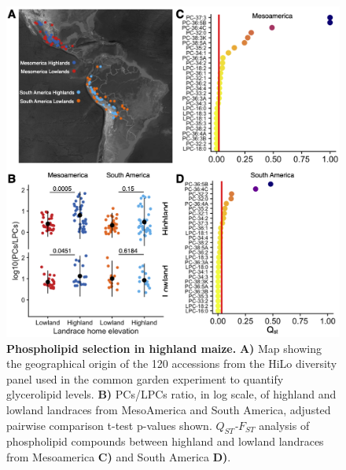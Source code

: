 \documentclass[9pt,twocolumn,twoside,lineno]{BioRxiv}
\begin{document}
\begin{figure}[!ht]
\begin{center}
\includegraphics[width=0.4\paperwidth]{Figures/Fig_1.png}
\caption{\textbf{Phospholipid selection in highland maize.} 
\textbf{A)} Map showing the geographical origin of the 120 accessions from the HiLo diversity panel used in the common garden experiment to quantify glycerolipid levels.
\textbf{B)} PCs/LPCs ratio, in log scale, of highland and lowland landraces from MesoAmerica and South America, adjusted pairwise comparison t-test p-values shown.
\textit{$Q_{ST}$-$F_{ST}$} analysis of phospholipid compounds between highland and lowland landraces from Mesoamerica \textbf{C)} and South America \textbf{D)}.
} 
\label{Fig1}
\end{center}
\end{figure}
\end{document}
